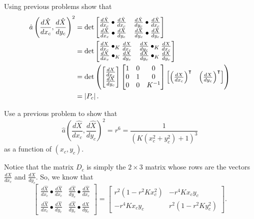 \documentclass{ximera}
\begin{document}
\begin{problem}
Using previous problems show that%
\begin{align*}
\hat{a}\left(  \frac{d\hat{X}}{dx_{c}},\frac{d\hat{X}}{dy_{c}}\right)  ^{2}
&  =\det
\begin{bmatrix}
\frac{d\hat{X}}{dx_{c}}\bullet\frac{d\hat{X}}{dx_{c}} & \frac{d\hat{X}}%
{dy_{c}}\bullet\frac{d\hat{X}}{dx_{c}}\\
\frac{d\hat{X}}{dx_{c}}\bullet\frac{d\hat{X}}{dy_{c}} & \frac{d\hat{X}}%
{dy_{c}}\bullet\frac{d\hat{X}}{dy_{c}}%
\end{bmatrix} \\
&  =\det
\begin{bmatrix}
\frac{dX}{dx_{c}}\bullet_{K}\frac{dX}{dx_{c}} & \frac{dX}{dy_{c}}\bullet
_{K}\frac{dX}{dx_{c}}\\
\frac{dX}{dx_{c}}\bullet_{K}\frac{dX}{dy_{c}} & \frac{dX}{dy_{c}}\bullet
_{K}\frac{dX}{dy_{c}}%
\end{bmatrix} \\
&=\det\left(\begin{bmatrix}
\frac{dX}{dx_{c}} \\
\frac{dX}{dy_{c}}
\end{bmatrix} 
\begin{bmatrix}
1 & 0 & 0\\
0 & 1 & 0\\
0 & 0 & K^{-1}%
\end{bmatrix}\begin{bmatrix}
\left(  \frac{dX}{dx_{c}}\right)  ^\transpose & \left(  \frac{dX}{dy_{c}}\right)
^\transpose%
\end{bmatrix}\right) \\
&  =\left\vert P_{c}\right\vert .
\end{align*}

\end{problem}

\begin{problem}
\label{79}Use a previous problem to show that%
\[
\hat{a}\left(  \frac{d\hat{X}}{dx_{c}},\frac{d\hat{X}}{dy_{c}}\right)
^{2}=r^{6}=\frac{1}{\left(  K\left(  x_{c}^{2}+y_{c}^{2}\right)  +1\right)
^{3}}%
\]
as a function of $\left(  x_{c},y_{c}\right)  $.

\begin{hint}
Notice that the matrix $D_{c}$ is simply the $2\times3$ matrix whose
rows are the vectors $\frac{dX}{dx_{c}}$ and $\frac {dX}{dy_{c}}$. So, we know that%
\[
\begin{bmatrix}
\frac{d\hat{X}}{dx_{c}}\bullet\frac{d\hat{X}}{dx_{c}} & \frac{d\hat{X}}%
{dy_{c}}\bullet\frac{d\hat{X}}{dx_{c}}\\
\frac{d\hat{X}}{dx_{c}}\bullet\frac{d\hat{X}}{dy_{c}} & \frac{d\hat{X}}%
{dy_{c}}\bullet\frac{d\hat{X}}{dy_{c}}%
\end{bmatrix} =
\begin{bmatrix}
r^{2}\left(  1-r^{2}Kx_{c}^{2}\right)  & -r^{4}Kx_{c}y_{c}\\
-r^{4}Kx_{c}y_{c} & r^{2}\left(  1-r^{2}Ky_{c}^{2}\right)
\end{bmatrix} .
\]
\end{hint}
\end{problem}
\end{document}
